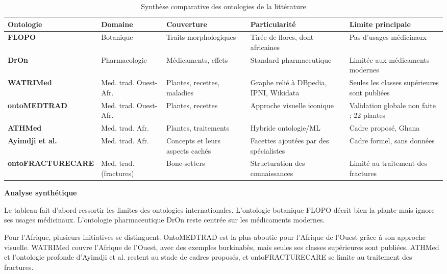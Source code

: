 \begin{table}[H]
\centering
\caption{Synthèse comparative des ontologies de la littérature}
\label{tab:synthese_ontologies}
\small
\begin{tabularx}{\textwidth}{>{\bfseries}l >{\raggedright\arraybackslash}X >{\raggedright\arraybackslash}X >{\raggedright\arraybackslash}X >{\raggedright\arraybackslash}X}
\toprule
Ontologie & Domaine & Couverture & Particularité & Limite principale \\
\midrule
FLOPO \cite{hoehndorf2016flopo} & Botanique & Traits morphologiques & Tirée de flores, dont africaines & Pas d'usages médicinaux \\
\addlinespace
DrOn \cite{hanna2013dron} & Pharmacologie & Médicaments, effets & Standard pharmaceutique & Limitée aux médicaments modernes \\
\addlinespace
WATRIMed \cite{watrimed2019, watrimed_design_2019} & Med. trad. Ouest-Afr. & Plantes, recettes, maladies & Graphe relié à DBpedia, IPNI, Wikidata & Seules les classes supérieures sont publiées \\
\addlinespace
ontoMEDTRAD \cite{kouame_systeme_2018} & Med. trad. Ouest-Afr. & Plantes, recettes & Approche visuelle iconique & Validation globale non faite ; 22 plantes \\
\addlinespace
ATHMed \cite{devine_knowledge_2022} & Med. trad. Afr. & Plantes, traitements & Hybride ontologie/ML & Cadre proposé, Ghana \\
\addlinespace
Ayimdji et al. \cite{ayimdji_towards_2011} & Med. trad. Afr. & Concepts et leurs aspects cachés & Facettes ajoutées par des spécialistes & Cadre formel, sans données \\
\addlinespace
ontoFRACTURECARE \cite{diomande_ontofracturecare_2024} & Med. trad. (fractures) & Bone-setters & Structuration des connaissances & Limité au traitement des fractures \\
\bottomrule
\end{tabularx}
\end{table}

\textbf{Analyse synthétique}

Le tableau fait d'abord ressortir les limites des ontologies internationales. L'ontologie botanique FLOPO décrit bien la plante mais ignore ses usages médicinaux. L'ontologie pharmaceutique DrOn reste centrée sur les médicaments modernes.

Pour l'Afrique, plusieurs initiatives se distinguent. OntoMEDTRAD \cite{kouame_systeme_2018} est la plus aboutie pour l'Afrique de l'Ouest grâce à son approche visuelle. WATRIMed \cite{watrimed2019, watrimed_design_2019} couvre l'Afrique de l'Ouest, avec des exemples burkinabès, mais seules ses classes supérieures sont publiées. ATHMed et l'ontologie profonde d'Ayimdji et al. restent au stade de cadres proposés, et ontoFRACTURECARE se limite au traitement des fractures.


